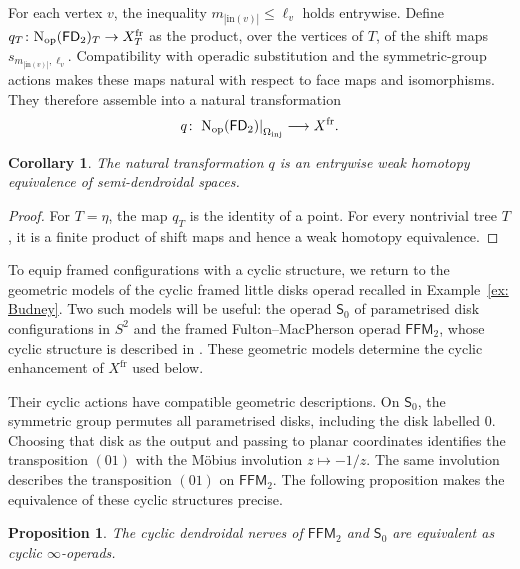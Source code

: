 \documentclass{amsart}
\newcommand{\nerve}{\textnormal{N}}
\newtheorem{prop}[theorem]{Proposition}%
\newtheorem{cor}[theorem]{Corollary}%
\theoremstyle{definition}
\numberwithin{equation}{section}
\begin{document}
For each vertex $v$, the inequality
$m_{|\mathrm{in}(v)|}\leq\ell_v$ holds entrywise. Define
$q_T\colon\nerve_{\mathrm{op}}(\mathsf{FD}_2)_T\to
X^{\mathrm{fr}}_T$ as the product, over the vertices of $T$, of the
shift maps $s_{m_{|\mathrm{in}(v)|},\ell_v}$. Compatibility with
operadic substitution and the symmetric-group actions makes these
maps natural with respect to face maps and isomorphisms. They
therefore assemble into a natural transformation
\[
q\colon
\left.\nerve_{\mathrm{op}}(\mathsf{FD}_2)
\right|_{\Omega_{\mathrm{inj}}}
\longrightarrow
X^{\mathrm{fr}}.
\]

\begin{cor}
\label{cor:nerve-FD2-eq-Xfr}
The natural transformation $q$ is an entrywise weak homotopy
equivalence of semi-dendroidal spaces.
\end{cor}

\begin{proof}
For $T=\eta$, the map $q_T$ is the identity of a point. For every
nontrivial tree $T$, it is a finite product of shift maps and hence a
weak homotopy equivalence.
\end{proof}

To equip framed configurations with a cyclic structure, we return to
the geometric models of the cyclic framed little disks operad
recalled in Example~\ref{ex: Budney}. Two such models will be useful:
the operad $\mathsf S_0$ of parametrised disk configurations in
$S^2$ and the framed Fulton--MacPherson operad $\mathsf{FFM}_2$,
whose cyclic structure is described in
\cite[Section~3.1]{campos2019configuration}. These geometric models
determine the cyclic enhancement of $X^{\mathrm{fr}}$ used below.

Their cyclic actions have compatible geometric descriptions. On
$\mathsf S_0$, the symmetric group permutes all parametrised disks,
including the disk labelled $0$. Choosing that disk as the output and
passing to planar coordinates identifies the transposition $(01)$
with the Möbius involution $z\mapsto-1/z$. The same involution
describes the transposition $(01)$ on $\mathsf{FFM}_2$. The following
proposition makes the equivalence of these cyclic structures precise.

\begin{prop}
\label{prop: cyclic comparison FFM2 S0}
The cyclic dendroidal nerves of $\mathsf{FFM}_2$ and $\mathsf S_0$
are equivalent as cyclic $\infty$-operads.
\end{prop}
\end{document}
